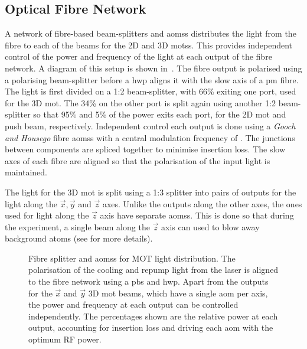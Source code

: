 \subsection{Optical Fibre Network}\label{subsec:optical_fibre}
A network of fibre-based beam-splitters and \acp{aoms} distributes the
light from the \Muquans fibre to each of the beams for the 2D and 3D
\acp{mots}. This provides independent control of the power and
frequency of the light at each output of the fibre network. A diagram of this
setup is shown in~. The \Muquans fibre output is polarised using a polarising beam-splitter before a
\ac{hwp} aligns it with the slow axis of a
\ac{pm} fibre. The light is first divided on a 1:2 beam-splitter, with 66\%
exiting one port, used for the 3D \ac{mot}. The 34\% on the other port is
split again using another 1:2 beam-splitter so that 95\% and 5\% of the power
exits each port, for the 2D \ac{mot} and push beam,
respectively. Independent control each output is done using a \textit{Gooch and Housego} fibre \acp{aoms} with a
central modulation frequency of . The junctions between components are spliced together
to minimise insertion loss. The slow axes of each fibre are aligned so that the polarisation of the input light is maintained. \par\noindent The light for the 3D \ac{mot} is split using a 1:3
splitter into pairs of outputs for the light along the \(\vec{x},\vec{y}\) and
\(\vec{z}\) axes. Unlike the outputs along the other axes, the ones used for
light along the \(\vec{z}\) axis have separate \acp{aoms}. This is done so that
during the experiment, a single beam along the \(\vec{z}\) axis can used to blow
away background atoms (see  for more details).

\begin{figure}[!htbp]
	\centering
	\fontsize{14pt}{16pt}
	\resizebox{0.5\textwidth}{!}{}
	\caption[Network of optical fibre splitters and \acp{aoms} for \ac{MOT}light distribution]{Fibre splitter and \acp{aoms} for \ac{MOT} light distribution. The polarisation of the cooling and repump light from the \Muquans laser is aligned to the fibre network using a \ac{pbs} and \ac{hwp}. Apart from the outputs for the \(\vec{x}\) and \(\vec{y}\) 3D \ac{mot} beams, which have a single \ac{aom} per axis, the power and frequency at each output can be controlled independently. The percentages shown are the relative power at each output, accounting for insertion loss and driving each \ac{aom} with the optimum RF power.}
	\label{fig:fibre_network}
\end{figure}

